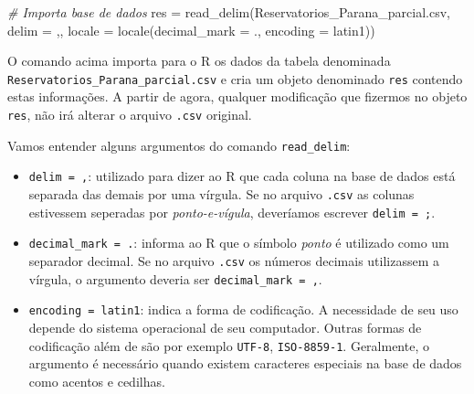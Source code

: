 \documentclass[
]{book}
\newenvironment{Shaded}{\begin{snugshade}}{\end{snugshade}}
\newcommand{\AttributeTok}[1]{\textcolor[rgb]{0.77,0.63,0.00}{#1}}
\newcommand{\CommentTok}[1]{\textcolor[rgb]{0.56,0.35,0.01}{\textit{#1}}}
\newcommand{\FunctionTok}[1]{\textcolor[rgb]{0.00,0.00,0.00}{#1}}
\newcommand{\NormalTok}[1]{#1}
\newcommand{\OtherTok}[1]{\textcolor[rgb]{0.56,0.35,0.01}{#1}}
\newcommand{\StringTok}[1]{\textcolor[rgb]{0.31,0.60,0.02}{#1}}
\begin{document}
\begin{Shaded}
\begin{Highlighting}[]
\CommentTok{\# Importa base de dados }
\NormalTok{res }\OtherTok{=} \FunctionTok{read\_delim}\NormalTok{(}\StringTok{\textquotesingle{}Reservatorios\_Parana\_parcial.csv\textquotesingle{}}\NormalTok{,}
                  \AttributeTok{delim =} \StringTok{\textquotesingle{},\textquotesingle{}}\NormalTok{,}
                  \AttributeTok{locale =} \FunctionTok{locale}\NormalTok{(}\AttributeTok{decimal\_mark =} \StringTok{\textquotesingle{}.\textquotesingle{}}\NormalTok{,}
                                  \AttributeTok{encoding =} \StringTok{\textquotesingle{}latin1\textquotesingle{}}\NormalTok{))}
\end{Highlighting}
\end{Shaded}

O comando acima importa para o R os dados da tabela denominada \texttt{Reservatorios\_Parana\_parcial.csv} e cria um objeto denominado \texttt{res} contendo estas informações. A partir de agora, qualquer modificação que fizermos no objeto \texttt{res}, não irá alterar o arquivo \texttt{.csv} original.

Vamos entender alguns argumentos do comando \texttt{read\_delim}:

\begin{itemize}
\item
  \texttt{delim\ =\ \textquotesingle{},\textquotesingle{}}: utilizado para dizer ao R que cada coluna na base de dados está separada das demais por uma vírgula. Se no arquivo \texttt{.csv} as colunas estivessem seperadas por \emph{ponto-e-vígula}, deveríamos escrever \texttt{delim\ =\ \textquotesingle{};\textquotesingle{}}.
\item
  \texttt{decimal\_mark\ =\ \textquotesingle{}.\textquotesingle{}}: informa ao R que o símbolo \emph{ponto} é utilizado como um separador decimal. Se no arquivo \texttt{.csv} os números decimais utilizassem a vírgula, o argumento deveria ser \texttt{decimal\_mark\ =\ \textquotesingle{},\textquotesingle{}}.
\item
  \texttt{encoding\ =\ \textquotesingle{}latin1\textquotesingle{}}: indica a forma de codificação. A necessidade de seu uso depende do sistema operacional de seu computador. Outras formas de codificação além de são por exemplo \texttt{UTF-8}, \texttt{ISO-8859-1}. Geralmente, o argumento é necessário quando existem caracteres especiais na base de dados como acentos e cedilhas.
\end{itemize}
\end{document}
